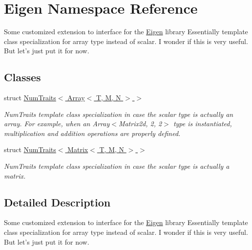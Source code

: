 \hypertarget{namespace_eigen}{\section{Eigen Namespace Reference}
\label{namespace_eigen}
}


Some customized extension to interface for the \hyperlink{namespace_eigen}{Eigen} library Essentially template class specialization for array type instead of scalar. I wonder if this is very useful. But let's just put it for now.  


\subsection*{Classes}
\begin{DoxyCompactItemize}
\item 
struct \hyperlink{struct_eigen_1_1_num_traits_3_01_array_3_01_t_00_01_m_00_01_n_01_4_01_4}{Num\-Traits$<$ Array$<$ T, M, N $>$ $>$}
\begin{DoxyCompactList}\small\item\em Num\-Traits template class specialization in case the scalar type is actually an array. For example, when an Array$<$\-Matrix2d, 2, 2$>$ type is instantiated, multiplication and addition operations are properly defined. \end{DoxyCompactList}\item 
struct \hyperlink{struct_eigen_1_1_num_traits_3_01_matrix_3_01_t_00_01_m_00_01_n_01_4_01_4}{Num\-Traits$<$ Matrix$<$ T, M, N $>$ $>$}
\begin{DoxyCompactList}\small\item\em Num\-Traits template class specialization in case the scalar type is actually a matrix. \end{DoxyCompactList}\end{DoxyCompactItemize}


\subsection{Detailed Description}
Some customized extension to interface for the \hyperlink{namespace_eigen}{Eigen} library Essentially template class specialization for array type instead of scalar. I wonder if this is very useful. But let's just put it for now. 
